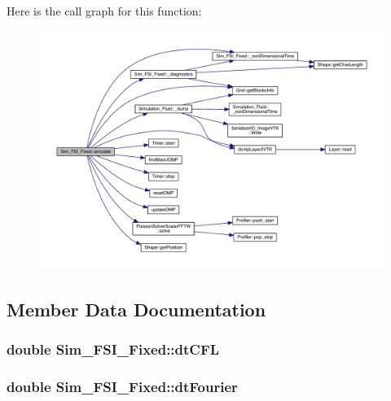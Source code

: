 Here is the call graph for this function\+:
\nopagebreak
\begin{figure}[H]
\begin{center}
\leavevmode
\includegraphics[width=350pt]{d8/d3d/class_sim___f_s_i___fixed_a1e37b29e07ddd05ae1f0c2be321e9bb2_cgraph}
\end{center}
\end{figure}




\subsection{Member Data Documentation}
\hypertarget{class_sim___f_s_i___fixed_a501b1373276553911410c679fa282b0d}{}
\subsubsection[{dt\+C\+F\+L}]{\setlength{\rightskip}{0pt plus 5cm}double Sim\+\_\+\+F\+S\+I\+\_\+\+Fixed\+::dt\+C\+F\+L\hspace{0.3cm}{\ttfamily [protected]}}\label{class_sim___f_s_i___fixed_a501b1373276553911410c679fa282b0d}
\hypertarget{class_sim___f_s_i___fixed_a5dea9750a2ba748dc420274b88f31f75}{}
\subsubsection[{dt\+Fourier}]{\setlength{\rightskip}{0pt plus 5cm}double Sim\+\_\+\+F\+S\+I\+\_\+\+Fixed\+::dt\+Fourier\hspace{0.3cm}{\ttfamily [protected]}}\label{class_sim___f_s_i___fixed_a5dea9750a2ba748dc420274b88f31f75}
\hypertarget{class_sim___f_s_i___fixed_a309a6019a5f0d5bb2eed40d2afc362e8}{}
